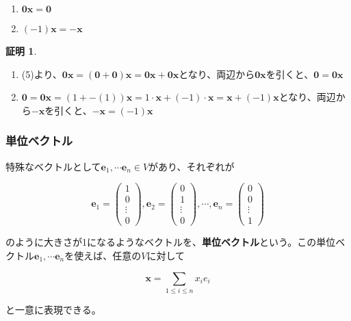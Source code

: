 \documentclass[dvipdfmx,autodetect-engine]{jsarticle}
\theoremstyle{definition}
\newtheorem*{Proof*}{証明}
\begin{document}

\begin{enumerate}
\renewcommand{\labelenumi}{(\arabic{enumi})}
\item $\bm{0}\bm{x} = \bm{0}$
\item $(-1)\bm{x} = -\bm{x}$
\end{enumerate}

\begin{Proof*}
\begin{enumerate}
\renewcommand{\labelenumi}{(\arabic{enumi})}
\item (5)より、$\bm{0}\bm{x} = (\bm{0} + \bm{0})\bm{x} = \bm{0}\bm{x} + \bm{0}\bm{x}$となり、両辺から$\bm{0}\bm{x}$を引くと、$\bm{0} = \bm{0}\bm{x}$
\item $\bm{0} = \bm{0}\bm{x} = (1 + -(1))\bm{x} = 1 \cdot \bm{x} + (-1) \cdot \bm{x} = \bm{x} + (-1)\bm{x}$となり、両辺から$-\bm{x}$を引くと、$-\bm{x} = (-1)\bm{x}$
\end{enumerate}

\subsubsection{単位ベクトル}\label{subsection:unitVector}

特殊なベクトルとして$\bm{e}_1, \cdots \bm{e}_n \in V$があり、それぞれが

$$
\bm{e}_1 = \begin{pmatrix}
1 \\
0 \\
\vdots \\
0
\end{pmatrix},
\bm{e}_2 = \begin{pmatrix}
0 \\
1 \\
\vdots \\
0
\end{pmatrix}, 
\cdots, 
\bm{e}_n = \begin{pmatrix}
0 \\
0 \\
\vdots \\
1
\end{pmatrix}
$$

のように大きさが1になるようなベクトルを、{\bf 単位ベクトル}という。この単位ベクトル$\bm{e}_1, \cdots \bm{e}_n$を使えば、任意の$V$に対して

$$
\bm{x} = \sum_{1 \leq i \leq n} x_ie_i
$$

と一意に表現できる。
\end{Proof*}
\end{document}
